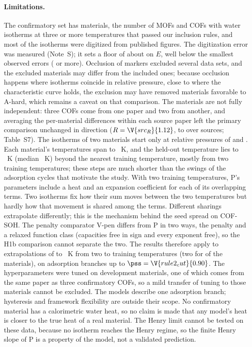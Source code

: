 \documentclass[journal=jcisd8,manuscript=article]{achemso}
\begin{document}
\paragraph{Limitations.} The confirmatory set has  materials, the number of MOFs and COFs with
water isotherms at three or more temperatures that passed our inclusion rules, and most of the isotherms were
digitized from published figures. The digitization error was measured (Note~S); it sets a floor of about
 on $E$, well below the smallest observed errors ( or more). Occlusion of markers
excluded several data sets, and the excluded materials may differ from the included ones; because occlusion happens
where isotherms coincide in relative pressure, close to where the characteristic curve holds, the exclusion may have
removed materials favorable to A-hard, which remains a caveat on that comparison. The materials are not fully
independent: three COFs come from one paper and two from another, and averaging the per-material differences
within each source paper left the primary comparison unchanged in direction ($R = \V{src_R}{1.12}$, 
to  over  sources; Table~S7). The isotherms of two materials start only at relative
pressures of  and . Each material's temperatures span  to
~K, and the held-out temperature lies  to ~K (median ~K)
beyond the nearest training temperature, mostly from two training temperatures; these steps are much shorter than
the swings of the adsorption cycles that motivate the study. With two training temperatures, P's 
parameters include a heat and an expansion coefficient for each of its  overlapping terms. Two
isotherms fix how their sum moves between the two temperatures but hardly how that movement is shared among the
terms. Different sharings extrapolate differently; this is the mechanism behind the seed spread on
COF-SOH. The penalty comparator V-pen differs from P in two ways, the penalty and a relaxed
function class (capacities free in sign and every exponent free), so the H1b comparison cannot separate the two. The results therefore apply to extrapolations of  to
~K from two to  training temperatures (two for  of the
 materials), on adsorption branches up to $\pss =
\V{rule2_cut}{0.90}$. The
hyperparameters were tuned on development materials, one of which comes from the same paper as three confirmatory
COFs, so a mild transfer of tuning to those materials cannot be excluded. The models describe one adsorption branch; hysteresis and framework flexibility are outside their scope.
No confirmatory material has a calorimetric water heat, so no claim is made that any model's heat is closer to the
true heat of a real material. The Henry limit cannot be tested on these data, because no isotherm reaches the
Henry regime, so the finite Henry slope of P is a property of the model, not a validated prediction.
\end{document}
